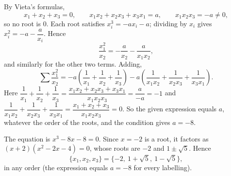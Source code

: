 By Vieta's formulas,
\[
x_1+x_2+x_3=0,\qquad x_1x_2+x_2x_3+x_3x_1=a,\qquad x_1x_2x_3=-a\ne0,
\]
so no root is $0$. Each root satisfies $x_i^3=-ax_i-a$; dividing by $x_i$ gives $x_i^2=-a-\dfrac{a}{x_i}$. Hence
\[
\dfrac{x_1^2}{x_2}=-\dfrac{a}{x_2}-\dfrac{a}{x_1x_2},
\]
and similarly for the other two terms. Adding,
\[
\sum\dfrac{x_1^2}{x_2}=-a\left(\dfrac{1}{x_1}+\dfrac{1}{x_2}+\dfrac{1}{x_3}\right)-a\left(\dfrac{1}{x_1x_2}+\dfrac{1}{x_2x_3}+\dfrac{1}{x_3x_1}\right).
\]
Here $\dfrac{1}{x_1}+\dfrac{1}{x_2}+\dfrac{1}{x_3}=\dfrac{x_1x_2+x_2x_3+x_3x_1}{x_1x_2x_3}=\dfrac{a}{-a}=-1$ and $\dfrac{1}{x_1x_2}+\dfrac{1}{x_2x_3}+\dfrac{1}{x_3x_1}=\dfrac{x_1+x_2+x_3}{x_1x_2x_3}=0$. So the given expression equals $a$, whatever the order of the roots, and the condition gives $a=-8$.

The equation is $x^3-8x-8=0$. Since $x=-2$ is a root, it factors as $(x+2)(x^2-2x-4)=0$, whose roots are $-2$ and $1\pm\sqrt5$. Hence
\[
\{x_1,x_2,x_3\}=\boxed{\{-2,\ 1+\sqrt5,\ 1-\sqrt5\}},
\]
in any order (the expression equals $a=-8$ for every labelling).
